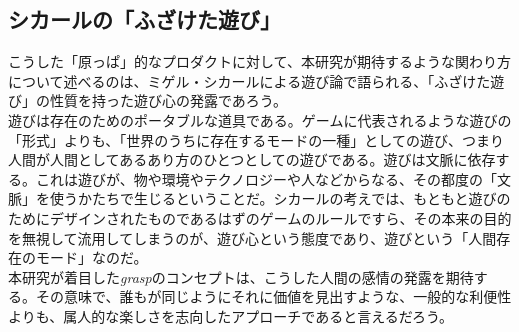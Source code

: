 \subsection{シカールの「ふざけた遊び」}
こうした「原っぱ」的なプロダクトに対して、本研究が期待するような関わり方について述べるのは、ミゲル・シカールによる遊び論で語られる、「ふざけた遊び」の性質を持った遊び心の発露であろう。\\
遊びは存在のためのポータブルな道具である。ゲームに代表されるような遊びの「形式」よりも、「世界のうちに存在するモードの一種」としての遊び、つまり人間が人間としてあるあり方のひとつとしての遊びである。遊びは文脈に依存する。これは遊びが、物や環境やテクノロジーや人などからなる、その都度の「文脈」を使うかたちで生じるということだ。シカールの考えでは、もともと遊びのためにデザインされたものであるはずのゲームのルールですら、その本来の目的を無視して流用してしまうのが、遊び心という態度であり、遊びという「人間存在のモード」なのだ。\\
本研究が着目した\textit{grasp}のコンセプトは、こうした人間の感情の発露を期待する。その意味で、誰もが同じようにそれに価値を見出すような、一般的な利便性よりも、属人的な楽しさを志向したアプローチであると言えるだろう。